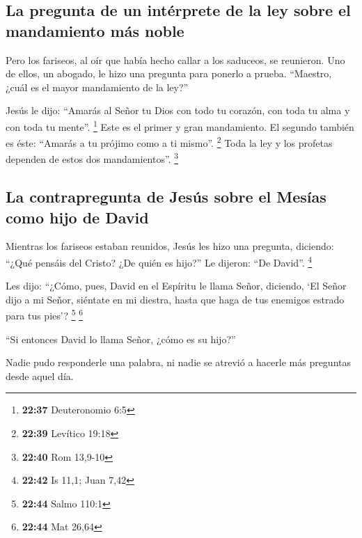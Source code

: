 \begin{paracol}{2}
{\subsection{La pregunta de un intérprete de la ley sobre el mandamiento
más
noble}\label{la-pregunta-de-un-intuxe9rprete-de-la-ley-sobre-el-mandamiento-muxe1s-noble}}

 Pero los fariseos, al oír que había hecho callar a los
saduceos, se reunieron.  Uno de ellos, un abogado, le
hizo una pregunta para ponerlo a prueba.  ``Maestro,
¿cuál es el mayor mandamiento de la ley?''

 Jesús le dijo: ``Amarás al Señor tu Dios con todo tu
corazón, con toda tu alma y con toda tu mente''. \footnote{\textbf{22:37}
  Deuteronomio 6:5}  Este es el primer y gran
mandamiento.  El segundo también es éste: ``Amarás a tu
prójimo como a ti mismo''. \footnote{\textbf{22:39} Levítico 19:18}
 Toda la ley y los profetas dependen de estos dos
mandamientos''. \footnote{\textbf{22:40} Rom 13,9-10}

\hypertarget{la-contrapregunta-de-jesuxfas-sobre-el-mesuxedas-como-hijo-de-david}{%
\subsection{La contrapregunta de Jesús sobre el Mesías como hijo de
David}\label{la-contrapregunta-de-jesuxfas-sobre-el-mesuxedas-como-hijo-de-david}}

 Mientras los fariseos estaban reunidos, Jesús les hizo
una pregunta,  diciendo: ``¿Qué pensáis del Cristo? ¿De
quién es hijo?'' Le dijeron: ``De David''. \footnote{\textbf{22:42} Is
  11,1; Juan 7,42}

 Les dijo: ``¿Cómo, pues, David en el Espíritu le llama
Señor, diciendo,  `El Señor dijo a mi Señor, siéntate en
mi diestra, hasta que haga de tus enemigos estrado para tus pies'?
\footnote{\textbf{22:44} Salmo 110:1} \footnote{\textbf{22:44} Mat 26,64}

 ``Si entonces David lo llama Señor, ¿cómo es su hijo?''

 Nadie pudo responderle una palabra, ni nadie se atrevió
a hacerle más preguntas desde aquel día.

\switchcolumn
\begin{otherlanguage}{english}

\hypertarget{the-parable-of-the-royal-wedding-supper}{%
}
\end{otherlanguage}
\end{paracol}
